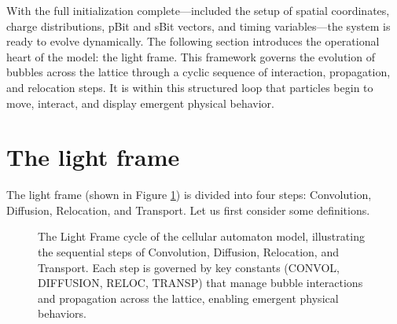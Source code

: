 \documentclass[12pt,english]{article}
\begin{document}
With the full initialization complete—included the setup of spatial coordinates, charge distributions, pBit and sBit vectors, and timing variables—the system is ready to evolve dynamically. The following section introduces the operational heart of the model: the light frame. This framework governs the evolution of bubbles across the lattice through a cyclic sequence of interaction, propagation, and relocation steps. It is within this structured loop that particles begin to move, interact, and display emergent physical behavior.


\section{The light frame}\label{sec:light-frame}

The light frame (shown in Figure \ref{fig:light_frame}) is divided into four steps: Convolution, Diffusion, Relocation, and Transport. Let us first consider some definitions.

\begin{figure}
\centering

\caption{The Light Frame cycle of the cellular automaton model, illustrating the sequential steps of Convolution, Diffusion, Relocation, and Transport. Each step is governed by key constants (CONVOL, DIFFUSION, RELOC, TRANSP) that manage bubble interactions and propagation across the lattice, enabling emergent physical behaviors.}
\label{fig:light_frame}
\end{figure}
\end{document}
